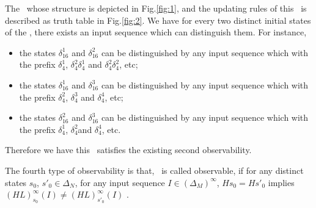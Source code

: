 \begin{example}
The \BCN\ whose structure is depicted in Fig.\ref{fig:1}, and the updating rules of this \BCN\ is described as truth table in Fig.\ref{fig:2}.  We have for every two distinct initial states of the \BCN, there exists an input sequence which can distinguish them.  For instance,
\begin{itemize}
  \item the states $\delta_{16}^1$ and $\delta_{16}^2$ can be distinguished by any input sequence which with the prefix $\delta_{4}^1$, $\delta_{4}^2 \delta_{4}^1$ and $\delta_{4}^2 \delta_{4}^2$, etc;
  \item the states $\delta_{16}^1$ and $\delta_{16}^3$  can be distinguished by any input sequence which with the prefix $\delta_{4}^2$, $\delta_{4}^3$ and $\delta_{4}^4$, etc;
  \item the states $\delta_{16}^2$ and $\delta_{16}^3$  can be distinguished by any input sequence which with the prefix $\delta_{4}^1$, $\delta_{4}^2$and $\delta_{4}^4$, etc.
\end{itemize} 
Therefore we have this \BCN\ satisfies the existing second observability.
\end{example}  
\begin{definition}
	The fourth type of observability is that, \BCN\ is called observable, if for any distinct states $s_0$, ${s'}_0 \in \Delta_N$, for any input sequence $I\in(\Delta_M)^{\infty}$, $Hs_0=H{s'}_0$ implies $(HL)^{\infty}_{s_0}(I)\neq (HL)^{\infty}_{{s'}_0}(I)$ \cite{Fornasini2013Observability}.
\end{definition}

